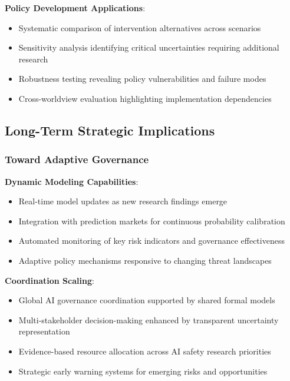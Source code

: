 \documentclass[
  11pt,
  letterpaper,
]{book}
\providecommand{\tightlist}{%
  \setlength{\itemsep}{0pt}\setlength{\parskip}{0pt}}
\begin{document}
\textbf{Policy Development Applications}:

\begin{itemize}
\tightlist
\item
  Systematic comparison of intervention alternatives across scenarios
\item
  Sensitivity analysis identifying critical uncertainties requiring
  additional research
\item
  Robustness testing revealing policy vulnerabilities and failure modes
\item
  Cross-worldview evaluation highlighting implementation dependencies
\end{itemize}

\subsection{Long-Term Strategic
Implications}\label{sec-strategic-implications}

\subsubsection{Toward Adaptive
Governance}\label{sec-adaptive-governance}

\textbf{Dynamic Modeling Capabilities}:

\begin{itemize}
\tightlist
\item
  Real-time model updates as new research findings emerge
\item
  Integration with prediction markets for continuous probability
  calibration
\item
  Automated monitoring of key risk indicators and governance
  effectiveness
\item
  Adaptive policy mechanisms responsive to changing threat landscapes
\end{itemize}

\textbf{Coordination Scaling}:

\begin{itemize}
\tightlist
\item
  Global AI governance coordination supported by shared formal models
\item
  Multi-stakeholder decision-making enhanced by transparent uncertainty
  representation
\item
  Evidence-based resource allocation across AI safety research
  priorities
\item
  Strategic early warning systems for emerging risks and opportunities
\end{itemize}
\end{document}
